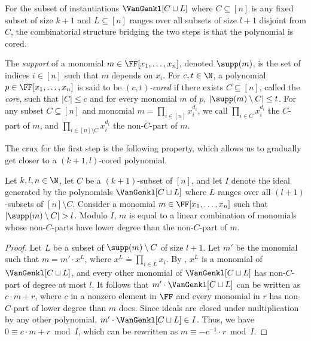 \documentclass{toc}
\begin{document}
For the subset of instantiations $\VanGenkl[C \sqcup L]$ where $C \subseteq [n]$ is any fixed subset of size $k+1$ and $L \subseteq [n]$ ranges over all subsets of size $l+1$ disjoint from $C$, the combinatorial structure bridging the two steps is that the polynomial is cored.

\begin{definition}
  \label{def.sunform}
  The \emph{support} of a monomial $m \in \FF[x_1,\dots,x_n]$, denoted $\supp(m)$, is the set of indices $i \in [n]$ such that $m$ depends on $x_i$. 
  For \(c,t\in\N\),
  a polynomial \(p \in \FF[x_1,\dots,x_n]\) is said to be \emph{\((c,t)\)-cored} if there exists $C \subseteq [n]$, called the \emph{core}, such that $|C| \le c$ and for every monomial $m$ of \(p\), $|\supp(m) \setminus C| \le t$.
  For any subset $C \subseteq [n]$ and monomial $m = \prod_{i \in [n]} x_i^{d_i}$, we call $\prod_{i \in C} x_i^{d_i}$ the $C$-part of $m$, and $\prod_{i \in [n] \setminus C} x_i^{d_i}$ the non-$C$-part of $m$.
\end{definition}

The crux for the first step is the following property, which allows us to gradually get closer to a $(k+1,l)$-cored polynomial. 

  \begin{proposition}
    \label{prop.lem.vangen-coredform}
    Let \(k,l,n\in\N\), let \(C\) be a \((k+1)\)-subset of \([n]\), and let $I$ denote the ideal generated by the polynomials $\VanGenkl[C \sqcup L]$ where $L$ ranges over all $(l+1)$-subsets of $[n] \setminus C$. Consider a monomial $m \in \FF[x_1,\dots,x_n]$ such that $|\supp(m) \setminus C| > l$. Modulo $I$, $m$ is equal to a linear combination of monomials whose non-$C$-parts have lower degree than the non-$C$-part of $m$.
  \end{proposition}
\begin{proof}
  Let $L$ be a subset of $\supp(m) \setminus C$ of size $l+1$. Let $m'$ be the monomial such that $m = m' \cdot x^L$, where $x^L \doteq \prod_{i \in L} x_i$.
  By ,
  \(x^L\) is a monomial of $\VanGenkl[C \sqcup L]$,
  and every other monomial of $\VanGenkl[C \sqcup L]$ has non-$C$-part of degree at most $l$. 
  It follows that $m' \cdot \VanGenkl[C \sqcup L]$ can be written as $c \cdot m + r$, where $c$ in a nonzero element in $\FF$ and every monomial in $r$ has non-$C$-part of lower degree than $m$ does. Since ideals are closed under multiplication by any other polynomial, $m' \cdot \VanGenkl[C \sqcup L] \in I$. Thus, we have $0 \equiv c \cdot m +r \bmod I$, which can be rewritten as $m \equiv - c^{-1} \cdot r \bmod I$.
\end{proof}
\end{document}
